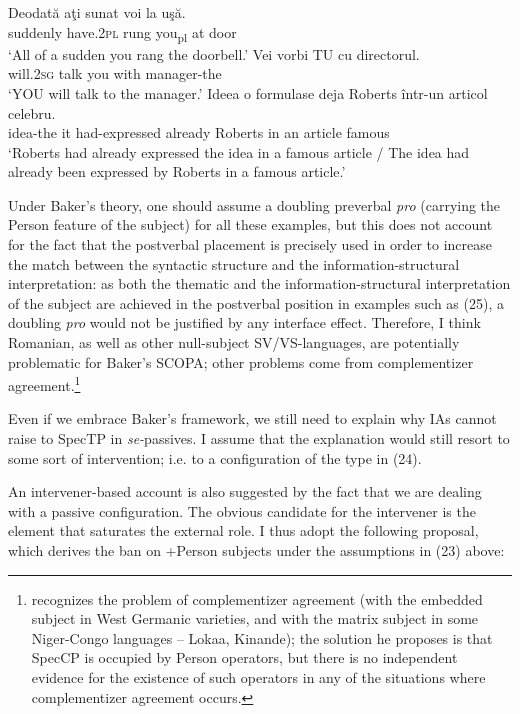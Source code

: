 \documentclass[output=paper]{langsci/langscibook}
\begin{document}
\ea%
    \label{ex:giurgea:25}
    \ea
    \gll Deodată   aţi           sunat   voi     la  uşă.  \\
          suddenly have.\textsc{2pl}  rung   you\textsubscript{pl}   at door\\
    \glt ‘All of a sudden you rang the doorbell.’
    \ex
    \gll Vei        vorbi TU  cu    directorul.         \\
         will.\textsc{2sg} talk    you with manager-the\\
    \glt ‘YOU will talk to the manager.’
    \ex
    \gll Ideea    o formulase         deja      Roberts într-un articol celebru. \\
         idea-the it had-expressed already Roberts  {in  an} article  famous    \\
    \glt ‘Roberts had already expressed the idea in a famous article / The idea had already been expressed by Roberts in a famous article.’
    \z
\z       

Under Baker’s theory, one should assume a doubling preverbal \textit{pro} (carrying the Person feature of the subject) for all these examples, but this does not account for the fact that the postverbal placement is precisely used in order to increase the match between the syntactic structure and the information-structural interpretation: as both the thematic and the information-structural interpretation of the subject are achieved in the postverbal position in examples such as (25), a doubling \textit{pro} would not be justified by any interface effect. Therefore, I think Romanian, as well as other null-subject SV/VS-languages, are potentially problematic for Baker’s SCOPA; other problems come from complementizer agreement.\footnote{\citet{Baker2008} recognizes the problem of complementizer agreement (with the embedded subject in West Germanic varieties, and with the matrix subject in some Niger-Congo languages – Lokaa, Kinande); the solution he proposes is that SpecCP is occupied by Person operators, but there is no independent evidence for the existence of such operators in any of the situations where complementizer agreement occurs.}

  Even if we embrace Baker’s framework, we still need to explain why IAs cannot raise to SpecTP in \textit{se-}passives. I assume that the explanation would still resort to some sort of intervention; i.e. to a configuration of the type in (24). 

  An intervener-based account is also suggested by the fact that we are dealing with a passive configuration. The obvious candidate for the intervener is the element that saturates the external role. I thus adopt the following proposal, which derives the ban on +Person subjects under the assumptions in (23) above:
\end{document}
